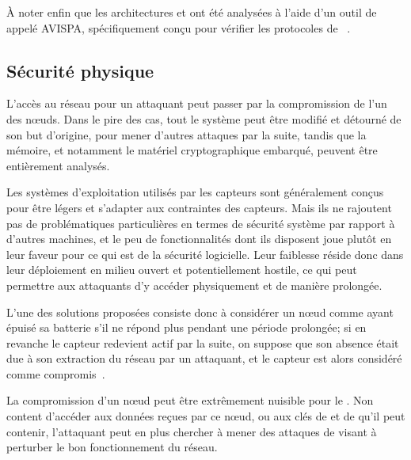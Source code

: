 À noter enfin que les architectures  et  ont été analysées à l'aide d'un outil de  appelé AVISPA, spécifiquement conçu pour vérifier les protocoles de \secu~\cite{TCCDC09}.

    \subsection{Sécurité physique}

L'accès au réseau pour un attaquant peut passer par la compromission de l'un des nœuds.
Dans le pire des cas, tout le système peut être modifié et détourné de son but d'origine, pour mener d'autres attaques par la suite, tandis que la mémoire, et notamment le matériel cryptographique embarqué, peuvent être entièrement analysés.

Les systèmes d'exploitation utilisés par les capteurs sont généralement conçus pour être légers et s'adapter aux contraintes des capteurs.
Mais ils ne rajoutent pas de problématiques particulières en termes de sécurité système par rapport à d'autres machines, et le peu de fonctionnalités dont ils disposent joue plutôt en leur faveur pour ce qui est de la sécurité logicielle.
Leur faiblesse réside donc dans leur déploiement en milieu ouvert et potentiellement hostile, ce qui peut permettre aux attaquants d'y accéder physiquement et de manière prolongée.

L'une des solutions proposées consiste donc à considérer un nœud comme ayant épuisé sa batterie s'il ne répond plus pendant une période prolongée; si en revanche le capteur redevient actif par la suite, on suppose que son absence était due à son extraction du réseau par un attaquant, et le capteur est alors considéré comme compromis~\cite{Ho10}.

La compromission d'un nœud peut être extrêmement nuisible pour le \rc.
Non content d'accéder aux données reçues par ce nœud, ou aux clés de  et de  qu'il peut contenir, l'attaquant peut en plus chercher à mener des attaques de \dds visant à perturber le bon fonctionnement du réseau.
